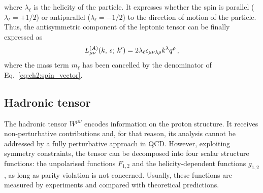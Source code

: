 where $\lambda_{\ell}$ is the helicity of the particle. It expresses whether the spin is parallel ($\lambda_{\ell} = +1/2$) or antiparallel ($\lambda_{\ell} = -1/2$) to the direction of motion of the particle. Thus, the antisymmetric component of the leptonic tensor can be finally expressed as
\begin{equation}
    L_{\mu \nu}^{(A)} \qty(k,\,s;\, k') = 2\lambda_{\ell} \epsilon_{\mu \nu \lambda \rho} k^{\lambda} q^{\rho} \,,
    \label{eq:lep_tens_anti}
\end{equation}
where the mass term $m_{\ell}$ has been cancelled by the denominator of Eq.~\eqref{eq:ch2:spin_vector}.

\subsection*{Hadronic tensor}
The hadronic tensor $W^{\mu \nu}$ encodes information on the proton structure. It receives non-perturbative contributions and, for that reason, its analysis cannot be addressed by a fully perturbative approach in QCD. However, exploiting symmetry constraints, the tensor can be decomposed into four scalar structure functions: the unpolarised functions $F_{1,2}$ and the helicity-dependent functions $g_{1,2}$, as long as parity violation is not concerned. Usually, these functions are measured by experiments and compared with theoretical predictions.%

